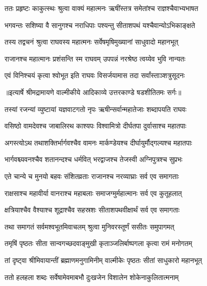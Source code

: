\twolineshloka
{ततः प्रहृष्टः काकुत्स्थः श्रुत्वा वाक्यं महात्मनः}
{ऋषींस्तत्र समेतांश्च राज्ञश्चैवाभ्यभाषत} %

\twolineshloka
{भगवन्तः सशिष्या वै सानुगश्च नराधिपाः}
{पश्यन्तु सीताशपथं यश्चैवान्योऽभिकाङ्क्षते} %

\twolineshloka
{तस्य तद्वचनं श्रुत्वा राघवस्य महात्मनः}
{सर्वेषमृषिमुख्यानां साधुवादो महानभूत्} %

\twolineshloka
{राजानश्च महात्मानः प्रशंसन्ति स्म राघवम्}
{उपपन्नं नरश्रेष्ठ त्वय्येव भुवि नान्यतः} %

\twolineshloka
{एवं विनिश्चयं कृत्वा श्वोभूत इति राघवः}
{विसर्जयामास तदा सर्वांस्ताञ्शत्रुसूदनः} %


{॥इत्यार्षे श्रीमद्रामायणे वाल्मीकीये आदिकाव्ये उत्तरकाण्डे षडशीतितमः सर्गः॥}


\twolineshloka
{तस्यां रजन्यां व्युष्टायां यज्ञवाटगतो नृपः}
{ऋषीन्सर्वान्महातेजाः शब्दापयति राघवः} %

\twolineshloka
{वसिष्ठो वामदेवश्च जाबालिरथ काश्यपः}
{विश्वामित्रो दीर्घतपा दुर्वासाश्च महातपाः} %

\twolineshloka
{अगस्त्योऽथ तथाशक्तिर्भार्गवश्चैव वामनः}
{मार्कण्डेयश्च दीर्घायुर्मौद्गल्यश्च महातपाः} %

\twolineshloka
{भार्गवश्च्यवनश्चैव शतानन्दश्च धर्मवित्}
{भरद्वाजश्च तेजस्वी अग्निपुत्रश्च सुप्रभः} %

\twolineshloka
{एते चान्ये च मुनयो बहवः संशितव्रताः}
{राजानश्च नरव्याघ्राः सर्व एव समागताः} %

\twolineshloka
{राक्षसाश्च महावीर्या वानराश्च महाबलाः}
{समाजग्मुर्महात्मानः सर्व एव कुतूहलात्} %

\twolineshloka
{क्षत्रियाश्चैव वैश्याश्च शूद्राश्चैव सहस्रशः}
{सीताशपथवीक्षार्थं सर्व एव समागताः} %

\twolineshloka
{तथा समागतं सर्वमश्वभूतमिवाचलम्}
{श्रुत्वा मुनिवरस्तूर्णं ससीतः समुपागमत्} %

\twolineshloka
{तमृषिं पृष्ठतः सीता सान्वगच्छदवाङ्मुखी}
{कृताञ्जलिर्बाष्पगला कृत्वा रामं मनोगतम्} %

\twolineshloka
{तां दृष्ट्वा श्रीमिवायान्तीं ब्रह्माणमनुगामिनीम्}
{वाल्मीकेः पृष्ठतः सीतां साधुकारो महानभूत्} %

\twolineshloka
{ततो हलहला शब्दः सर्वेषामेवमाबभौ}
{दुःखजेन विशालेन शोकेनाकुलितात्मनाम्} %

